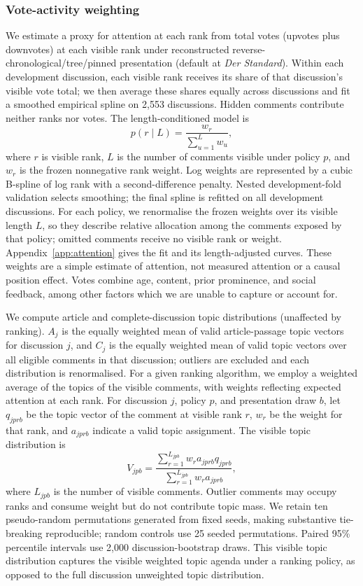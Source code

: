 \subsubsection{Vote-activity weighting}
We estimate a proxy for attention at each rank from total votes (upvotes plus downvotes) at each visible rank under reconstructed reverse-chronological/tree/pinned presentation (default at \textit{Der Standard}). Within each development discussion, each visible rank receives its share of that discussion's visible vote total; we then average these shares equally across discussions and fit a smoothed empirical spline on 2,553 discussions. Hidden comments contribute neither ranks nor votes. The length-conditioned model is
\begin{equation}
p(r\mid L)=\frac{w_r}{\sum_{u=1}^{L}w_u},
\end{equation}
where $r$ is visible rank, $L$ is the number of comments visible under policy $p$, and $w_r$ is the frozen nonnegative rank weight. Log weights are represented by a cubic B-spline of log rank with a second-difference penalty. Nested development-fold validation selects smoothing; the final spline is refitted on all development discussions. For each policy, we renormalise the frozen weights over its visible length $L$, so they describe relative allocation among the comments exposed by that policy; omitted comments receive no visible rank or weight. Appendix~\ref{app:attention} gives the fit and its length-adjusted curves. These weights are a simple estimate of attention, not measured attention or a causal position effect. Votes combine age, content, prior prominence, and social feedback, among other factors which we are unable to capture or account for.

We compute article and complete-discussion topic distributions (unaffected by ranking). $A_j$ is the equally weighted mean of valid article-passage topic vectors for discussion $j$, and $C_j$ is the equally weighted mean of valid topic vectors over all eligible comments in that discussion; outliers are excluded and each distribution is renormalised. For a given ranking algorithm, we employ a weighted average of the topics of the visible comments, with weights reflecting expected attention at each rank. For discussion $j$, policy $p$, and presentation draw $b$, let $q_{jprb}$ be the topic vector of the comment at visible rank $r$, $w_r$ be the weight for that rank, and $a_{jprb}$ indicate a valid topic assignment. The visible topic distribution is
\begin{equation}
V_{jpb}=\frac{\sum_{r=1}^{L_{jpb}}w_r a_{jprb}q_{jprb}}
{\sum_{r=1}^{L_{jpb}}w_r a_{jprb}},
\end{equation}
where $L_{jpb}$ is the number of visible comments. Outlier comments may occupy ranks and consume weight but do not contribute topic mass. We retain ten pseudo-random permutations generated from fixed seeds, making substantive tie-breaking reproducible; random controls use 25 seeded permutations. Paired 95\% percentile intervals use 2,000 discussion-bootstrap draws. This visible topic distribution captures the visible weighted topic agenda under a ranking policy, as opposed to the full discussion unweighted topic distribution.

